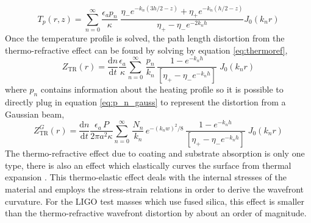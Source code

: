 	\begin{equation}
	T_p(r,z) = \sum_{n=0}^{\infty} \frac{\epsilon_a p_n}{\kappa}  \; \frac{ \eta_{-}e^{-k_n(3h/2-z)} + \eta_{+}e^{-k_n(h/2-z)}  }{\eta_{+} - \eta_{-} e^{-2k_n h} } J_0(k_n r)
	\end{equation} 
	Once the temperature profile is solved, the path length distortion from the thermo-refractive effect can be found by solving by equation \ref{eq:thermoref},
	\begin{equation}
	Z_{\text{TR}}(r) = \frac{\text{d}n}{\text{d}t} \frac{\epsilon_a}{\kappa} \sum_{n=0}^{\infty} \, \frac{p_n}{k_n} \, \frac{1- e^{-k_n h}}{[\eta_{+} - \eta_{-} e^{-k_nh}]} \; J_0(k_n r) 
	\end{equation}
	where $p_n$ contains information about the heating profile so it is possible to directly plug in equation \ref{eq:p_n_gauss} to represent the distortion from a Gaussian beam,
	\begin{equation}
	Z_{\text{TR}}^{G}(r) =  \frac{\text{d}n}{\text{d}t} \frac{\epsilon_a \, P}{2\pi a^2 \kappa} \sum_{n=0}^{\infty} \, \frac{N_n}{k_n}\, e^{-(k_n w)^2/8} \, \frac{1- e^{-k_n h}}{[\eta_{+} - \eta_{-} e^{-k_nh}]} \; J_0(k_n r) 
	\end{equation}
	The thermo-refractive effect due to coating and substrate absorption is only one type, there is also an effect which elastically curves the surface from thermal expansion \cite{Vinet_Thermal_Issues}.  This thermo-elastic effect deals with the internal stresses of the material and employs the stress-strain relations in order to derive the wavefront curvature.  For the LIGO test masses which use fused silica, this effect is smaller than the thermo-refractive wavefront distortion by about an order of magnitude.
	
